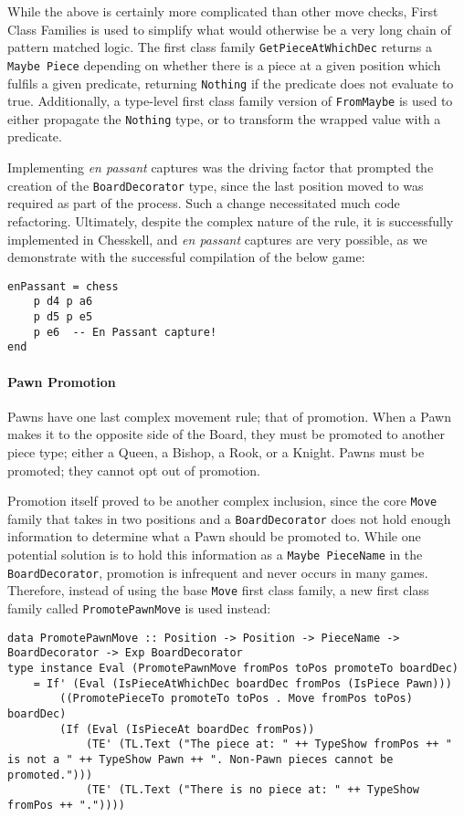 \documentclass[12pt, a4paper, bibliography=totocnumbered]{scrreprt}
\newcommand{\inline}[1]{\lstinline[basicstyle=\ttfamily\footnotesize]{#1}}
\begin{document}
While the above is certainly more complicated than other move checks, First Class Families is used to simplify what would otherwise be a very long chain of pattern matched logic. The first class family \inline{GetPieceAtWhichDec} returns a \inline{Maybe Piece} depending on whether there is a piece at a given position which fulfils a given predicate, returning \inline{Nothing} if the predicate does not evaluate to true. Additionally, a type-level first class family version of \inline{FromMaybe} is used to either propagate the \inline{Nothing} type, or to transform the wrapped value with a predicate.

Implementing \emph{en passant} captures was the driving factor that prompted the creation of the \inline{BoardDecorator} type, since the last position moved to was required as part of the process. Such a change necessitated much code refactoring. Ultimately, despite the complex nature of the rule, it is successfully implemented in Chesskell, and \emph{en passant} captures are very possible, as we demonstrate with the successful compilation of the below game:

\begin{lstlisting}
enPassant = chess
    p d4 p a6
    p d5 p e5
    p e6  -- En Passant capture!
end
\end{lstlisting}

\paragraph{Pawn Promotion}

Pawns have one last complex movement rule; that of promotion. When a Pawn makes it to the opposite side of the Board, they must be promoted to another piece type; either a Queen, a Bishop, a Rook, or a Knight. Pawns must be promoted; they cannot opt out of promotion.

Promotion itself proved to be another complex inclusion, since the core \inline{Move} family that takes in two positions and a \inline{BoardDecorator} does not hold enough information to determine what a Pawn should be promoted to. While one potential solution is to hold this information as a \inline{Maybe PieceName} in the \inline{BoardDecorator}, promotion is infrequent and never occurs in many games. Therefore, instead of using the base \inline{Move} first class family, a new first class family called \inline{PromotePawnMove} is used instead:

\begin{lstlisting}
data PromotePawnMove :: Position -> Position -> PieceName -> BoardDecorator -> Exp BoardDecorator
type instance Eval (PromotePawnMove fromPos toPos promoteTo boardDec)
    = If' (Eval (IsPieceAtWhichDec boardDec fromPos (IsPiece Pawn)))
        ((PromotePieceTo promoteTo toPos . Move fromPos toPos) boardDec)
        (If (Eval (IsPieceAt boardDec fromPos))
            (TE' (TL.Text ("The piece at: " ++ TypeShow fromPos ++ " is not a " ++ TypeShow Pawn ++ ". Non-Pawn pieces cannot be promoted.")))
            (TE' (TL.Text ("There is no piece at: " ++ TypeShow fromPos ++ "."))))
\end{lstlisting}
\end{document}
